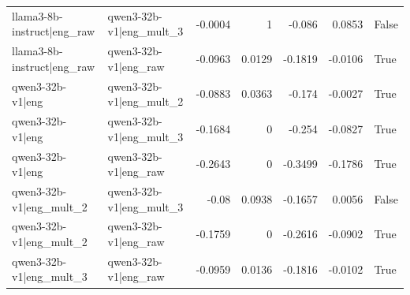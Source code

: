 \begin{table}
\begin{tabular}{l l r r r r l}
llama3-8b-instruct|eng_raw & qwen3-32b-v1|eng_mult_3 & -0.0004 & 1 & -0.086 & 0.0853 & False \\
llama3-8b-instruct|eng_raw & qwen3-32b-v1|eng_raw & -0.0963 & 0.0129 & -0.1819 & -0.0106 & True \\
qwen3-32b-v1|eng & qwen3-32b-v1|eng_mult_2 & -0.0883 & 0.0363 & -0.174 & -0.0027 & True \\
qwen3-32b-v1|eng & qwen3-32b-v1|eng_mult_3 & -0.1684 & 0 & -0.254 & -0.0827 & True \\
qwen3-32b-v1|eng & qwen3-32b-v1|eng_raw & -0.2643 & 0 & -0.3499 & -0.1786 & True \\
qwen3-32b-v1|eng_mult_2 & qwen3-32b-v1|eng_mult_3 & -0.08 & 0.0938 & -0.1657 & 0.0056 & False \\
qwen3-32b-v1|eng_mult_2 & qwen3-32b-v1|eng_raw & -0.1759 & 0 & -0.2616 & -0.0902 & True \\
qwen3-32b-v1|eng_mult_3 & qwen3-32b-v1|eng_raw & -0.0959 & 0.0136 & -0.1816 & -0.0102 & True \\
\bottomrule
\end{tabular}
\end{table}
